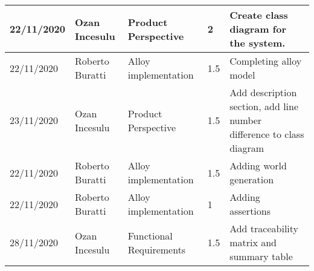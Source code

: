 \begin{table}[h]
\begin{tabular}{|p{2cm}|p{2cm}|p{2cm}|p{1.5cm}|p{8cm}|}
        22/11/2020 & Ozan Incesulu   & Product Perspective  & 2                & Create class diagram for the system. \\ \hline
        22/11/2020 & Roberto Buratti & Alloy implementation & 1.5              & Completing alloy model \\ \hline
        23/11/2020 & Ozan Incesulu   & Product Perspective  & 1.5              & Add description section, add line number difference to class diagram \\ \hline
        22/11/2020 & Roberto Buratti & Alloy implementation & 1.5              & Adding world generation \\ \hline
        22/11/2020 & Roberto Buratti & Alloy implementation & 1                & Adding assertions \\ \hline
        28/11/2020 & Ozan Incesulu & Functional Requirements & 1.5            & Add traceability matrix and summary table\\ \hline
    \end{tabular}
\end{table}
